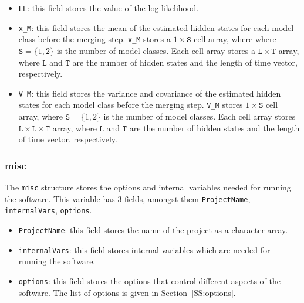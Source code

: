 \begin{itemize}
\item \lstinline[basicstyle = \mlttfamily \small ]!LL!: this field stores the value of the log-likelihood.
\item \lstinline[basicstyle = \mlttfamily \small ]!x_M!: this field stores the mean of the estimated hidden states for each model class before the merging step. \lstinline[basicstyle = \mlttfamily \small ]!x_M! stores a $1 \times \mathtt{S}$ cell array, where  where $\mathtt{S} = \{1,2 \}$ is the number of model classes. Each cell array stores a $\mathtt{L} \times \mathtt{T}$ array, where $\mathtt{L}$ and $\mathtt{T}$ are the number of hidden states and the length of time vector, respectively.
\item \lstinline[basicstyle = \mlttfamily \small ]!V_M!: this field stores the variance and covariance of the estimated hidden states for each model class before the merging step. \lstinline[basicstyle = \mlttfamily \small ]!V_M! stores $1 \times \mathtt{S}$ cell array, where $\mathtt{S} = \{1,2 \}$ is the number of model classes. Each cell array stores $\mathtt{L} \times  \mathtt{L} \times \mathtt{T}$ array, where $\mathtt{L}$ and $\mathtt{T}$ are the number of hidden states and the length of time vector, respectively.
\end{itemize}

\subsubsection{misc}
The \lstinline[basicstyle = \mlttfamily \small ]!misc! structure stores the options and internal variables needed for running the software.
This variable has 3 fields, amongst them \lstinline[basicstyle = \mlttfamily \small ]!ProjectName!, \lstinline[basicstyle = \mlttfamily \small ]!internalVars!, \lstinline[basicstyle = \mlttfamily \small ]!options!.

\begin{itemize}
\item \lstinline[basicstyle = \mlttfamily \small ]!ProjectName!: this field stores the name of the project as a character array.
\item \lstinline[basicstyle = \mlttfamily \small ]!internalVars!: this field stores internal variables which are needed for running the software.
\item \lstinline[basicstyle = \mlttfamily \small ]!options!: this field stores the options that control different aspects of the software. The list of options is given in Section~\ref{SS:options}.
\end{itemize}


